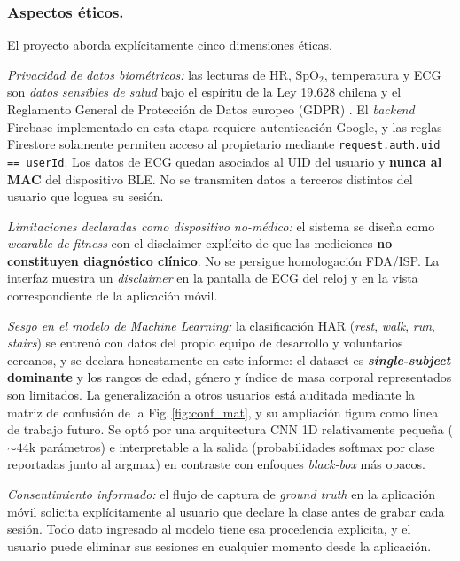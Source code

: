 \documentclass[letterpaper,11pt]{article}
\newcommand{\rfigura}[1]{Fig.\,\ref{#1}}
\begin{document}
\subsubsection*{Aspectos \'eticos.} El proyecto aborda expl\'icitamente cinco dimensiones \'eticas.

\emph{Privacidad de datos biom\'etricos:} las lecturas de HR, SpO$_2$, temperatura y ECG son \textit{datos sensibles de salud} bajo el esp\'iritu de la Ley 19.628 chilena \cite{ley19628} y el Reglamento General de Protecci\'on de Datos europeo (GDPR) \cite{gdpr}. El \textit{backend} Firebase implementado en esta etapa requiere autenticaci\'on Google, y las reglas Firestore \cite{firestore_rules} solamente permiten acceso al propietario mediante \texttt{request.auth.uid == userId}. Los datos de ECG quedan asociados al UID del usuario y \textbf{nunca al MAC} del dispositivo BLE. No se transmiten datos a terceros distintos del usuario que loguea su sesi\'on.

\emph{Limitaciones declaradas como dispositivo no-m\'edico:} el sistema se dise\~na como \textit{wearable de fitness} con el disclaimer expl\'icito de que las mediciones \textbf{no constituyen diagn\'ostico cl\'inico}. No se persigue homologaci\'on FDA/ISP. La interfaz muestra un \textit{disclaimer} en la pantalla de ECG del reloj y en la vista correspondiente de la aplicaci\'on m\'ovil.

\emph{Sesgo en el modelo de \textit{Machine Learning}:} la clasificaci\'on HAR (\textit{rest}, \textit{walk}, \textit{run}, \textit{stairs}) se entren\'o con datos del propio equipo de desarrollo y voluntarios cercanos, y se declara honestamente en este informe: el dataset es \textbf{\textit{single-subject} dominante} y los rangos de edad, g\'enero y \'indice de masa corporal representados son limitados. La generalizaci\'on a otros usuarios est\'a auditada mediante la matriz de confusi\'on de la \rfigura{fig:conf_mat}, y su ampliaci\'on figura como l\'inea de trabajo futuro. Se opt\'o por una arquitectura CNN 1D relativamente peque\~na ($\sim 44$k par\'ametros) e interpretable a la salida (probabilidades softmax por clase reportadas junto al argmax) en contraste con enfoques \textit{black-box} m\'as opacos.

\emph{Consentimiento informado:} el flujo de captura de \textit{ground truth} en la aplicaci\'on m\'ovil solicita expl\'icitamente al usuario que declare la clase antes de grabar cada sesi\'on. Todo dato ingresado al modelo tiene esa procedencia expl\'icita, y el usuario puede eliminar sus sesiones en cualquier momento desde la aplicaci\'on.
\end{document}
